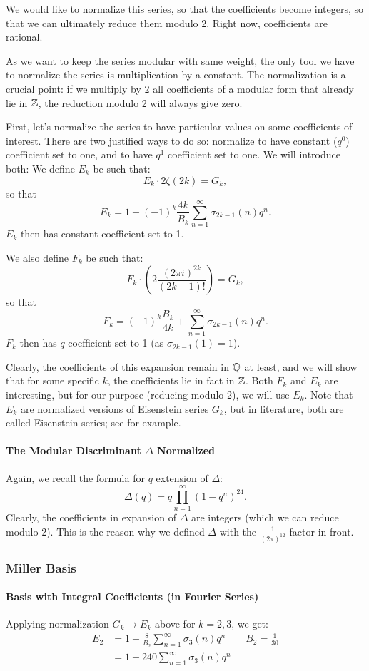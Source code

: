 We would like to normalize this series, so that the coefficients become integers, so that we can ultimately reduce them modulo 2.
Right now, coefficients are rational.

As we want to keep the series modular with same weight, the only tool we have to normalize the series is multiplication by a constant.
The normalization is a crucial point: if we multiply by $2$ all coefficients of a modular form that already lie in $\mathbb{Z}$, the reduction modulo 2 will always give zero.

First, let's normalize the series to have particular values on some coefficients of interest.
There are two justified ways to do so: normalize to have constant ($q^0$) coefficient set to one, and to have $q^1$ coefficient set to one.
We will introduce both:
We define $E_k$ be such that:
$$
E_k \cdot 2\zeta(2k) = G_k,
$$
so that
$$
E_k = 1 + (-1)^k \frac{4k}{B_k} \sum_{n=1}^{\infty} \sigma_{2k-1}(n)q^n.
$$
$E_k$ then has constant coefficient set to 1.

We also define $F_k$ be such that:
$$
F_k \cdot \left( 2 \frac{{(2 \pi i)}^{2k}}{(2k-1)!} \right) = G_k,
$$
so that
$$
F_k =  (-1)^k \frac{B_k}{4k} + \sum_{n=1}^{\infty} \sigma_{2k-1}(n)q^n.
$$
$F_k$ then has $q$-coefficient set to 1 (as $\sigma_{2k-1}(1)=1$).

Clearly, the coefficients of this expansion remain in $\mathbb{Q}$ at least, and we will show that for some specific $k$, the coefficients lie in fact in $\mathbb{Z}$.
Both $F_k$ and $E_k$ are interesting, but for our purpose (reducing modulo 2), we will use $E_k$.
Note that $E_k$ are normalized versions of Eisenstein series $G_k$, but in literature, both are called Eisenstein series; see \cite[p.6]{IntoductionModularFormsWorkshop} for example.

\paragraph{The Modular Discriminant $\Delta$ Normalized}
Again, we recall the formula for $q$ extension of $\Delta$:
$$
\Delta(q) = q \prod_{n=1}^{\infty} (1-q^n)^{24}.
$$
Clearly, the coefficients in expansion of $\Delta$ are integers (which we can reduce modulo 2).
This is the reason why we defined $\Delta$ with the $\frac{1}{(2\pi)^{12}}$ factor in front.


\subsubsection{Miller Basis}
\paragraph{Basis with Integral Coefficients (in Fourier Series)}
Applying normalization $G_k \to E_k$ above for $k=2,3$, we get:
\begin{align*}
	E_2 &= 1 + \frac{8}{B_2} \sum_{n=1}^{\infty} \sigma_{3}(n)q^n \qquad B_2 = \frac{1}{30} \\
	    &= 1 + 240 \sum_{n=1}^{\infty} \sigma_{3}(n)q^n
\end{align*}

